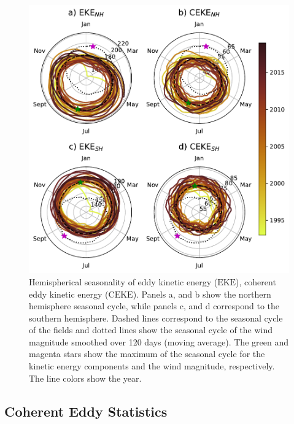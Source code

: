 \documentclass[draft,linenumbers]{agujournal2019}
\newcommand{\EKE}{\textrm{EKE}}
\newcommand{\CEKE}{\textrm{CEKE}}
\begin{document}
	\begin{figure}
	    \centering
	    \includegraphics[width=1\textwidth]{figures/All_polar_plots.pdf}
	    \caption{Hemispherical seasonality of eddy kinetic energy ($\EKE$), coherent eddy kinetic energy ($\CEKE$). Panels a, and b show the northern hemisphere seasonal cycle, while panels c, and d correspond to the southern hemisphere. Dashed lines correspond to the seasonal cycle of the fields and dotted lines show the seasonal cycle of the wind magnitude smoothed over 120 days (moving average). The green and magenta stars show the maximum of the seasonal cycle for the kinetic energy components and the wind magnitude, respectively. The line colors show the year.}
	    \label{fig:eddy_energy_polar}
	\end{figure}
	
	\subsection{Coherent Eddy Statistics}
	\label{subsec:CE_stats}
\end{document}
